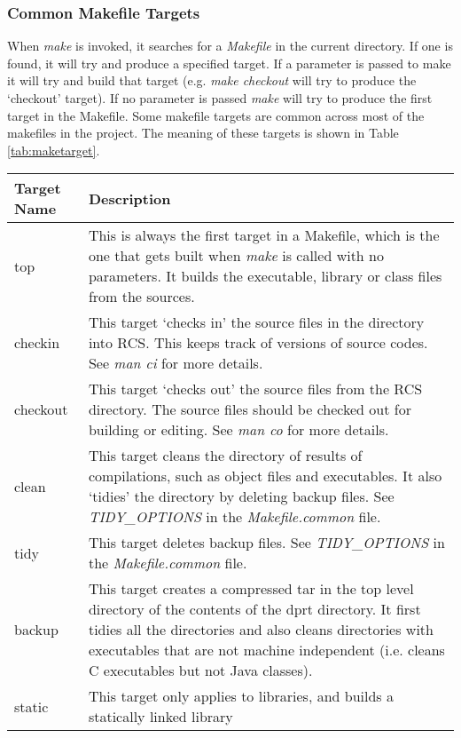 \documentclass[10pt,a4paper]{article}
\begin{document}
\subsubsection{Common Makefile Targets}
When {\em make} is invoked, it searches for a {\em Makefile} in the current directory. If one is found, it
will try and produce a specified target. If a parameter is passed to make it will try and build that target
(e.g. {\em make checkout} will try to produce the `checkout' target). If no parameter is passed {\em make} will
try to produce the first target in the Makefile.
Some makefile targets are common across most of the makefiles in the project. The meaning of these targets is
shown in Table \ref{tab:maketarget}.

\begin{table}[!h]
\begin{center}
\begin{footnotesize}
\begin{tabular}{|l|p{40em}|} \hline
{\bf Target Name} 	& {\bf Description}\\ \hline
top			& This is always the first target in a Makefile, which is the one that gets built 
when {\em make } is called with no parameters. It builds the executable, library or class files from the 
sources.\\ \hline
checkin			& This target `checks in' the source files in the directory into RCS. This keeps
track of versions of source codes. See {\em man ci} for more details.  \\ \hline
checkout		& This target `checks out' the source files from the RCS directory. The source files
should be checked out for building or editing. See {\em man co} for more details. \\ \hline
clean			& This target cleans the directory of results of compilations, such as object files and
executables. It also `tidies' the directory by deleting backup files. 
See {\em TIDY\_OPTIONS} in the {\em Makefile.common} file. \\ \hline
tidy			& This target deletes backup files. See {\em TIDY\_OPTIONS}
in the {\em Makefile.common} file.\\ \hline
backup			& This target creates a compressed tar in the top level directory of the contents of the dprt
directory. It first tidies all the directories and also cleans directories with executables that are not
machine independent (i.e. cleans C executables but not Java classes).\\ \hline
static			& This target only applies to libraries, and builds a statically linked library 

\end{tabular}
\end{footnotesize}
\end{center}
\end{table}
\end{document}
